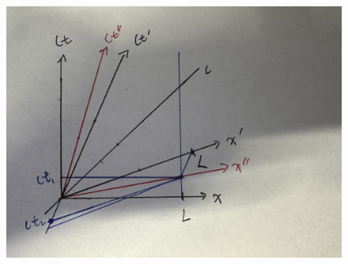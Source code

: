 \documentclass{article}
\begin{document}
\begin{itemize}
\begin{itemize}
\begin{figure}[h]
            \includegraphics*[scale = 0.05]{figure/phys225_hw7_fig1.jpeg}
        \end{figure}
    \end{itemize}
\end{itemize}
\end{document}
